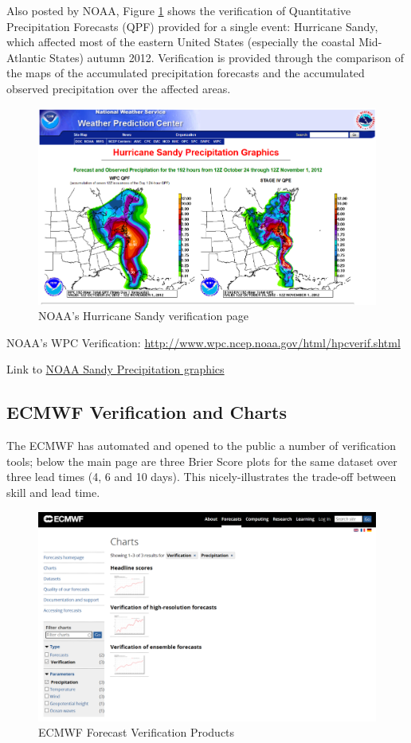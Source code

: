 \documentclass[logos,parttoc,morelanguage=french,morelanguage=german]{orsay-memoire}
\begin{document}
Also posted by NOAA, Figure \ref{fig:noaaSandy} shows the verification of Quantitative Precipitation Forecasts (QPF) provided for a single event: Hurricane Sandy, which affected most of the eastern United States (especially the coastal Mid-Atlantic States) autumn 2012. Verification is provided through the comparison of the maps of the accumulated precipitation forecasts and the accumulated observed precipitation over the affected areas.

\begin{figure}[H]
\centering
\includegraphics[width=0.70\linewidth]{images/noaaSandy.png}
  \caption{NOAA's Hurricane Sandy verification page}
  \label{fig:noaaSandy}
\end{figure}


NOAA's WPC Verification: \href{http://www.wpc.ncep.noaa.gov/html/hpcverif.shtml}{http://www.wpc.ncep.noaa.gov/html/hpcverif.shtml}

Link to \href{http://www.wpc.ncep.noaa.gov/tropical/case_studies/sandy_2012/sandyprecip.php}{NOAA Sandy Precipitation graphics}

\subsection*{ECMWF Verification and Charts}
The ECMWF has automated and opened to the public a number of verification tools; below the main page are three Brier Score plots for the same dataset over three lead times (4, 6 and 10 days). This nicely-illustrates the trade-off between skill and lead time.

\begin{figure}[hp]
\centering
\includegraphics[width=0.7\linewidth]{images/exempleECMWFverifselect.png}
  \caption{ECMWF Forecast Verification Products}
  \label{fig:exECMWFverificationpage}
\end{figure}
\end{document}

